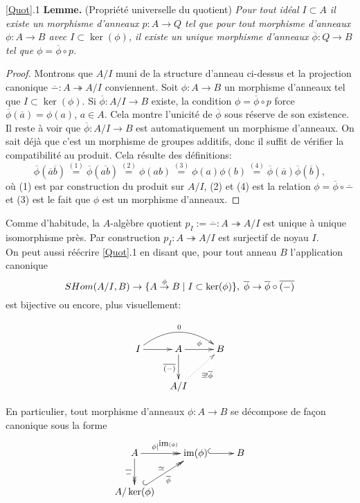 \documentclass[a4paper, oneside, 12pt]{book}
\theoremstyle{theoremeStyle} %
\theoremstyle{definition} %
\DeclareMathOperator{\SHom}{Hom}
\DeclareMathOperator{\im}{im}
\begin{document}
 \ref{Quot}.1 \textbf{Lemme.} (Propriété universelle du quotient) \textit{Pour tout idéal $I\subset A$ il existe un morphisme d'anneaux $p:A\rightarrow Q$ tel  que pour tout  morphisme d'anneaux $\phi:A\rightarrow B$ avec $I\subset \ker(\phi)$, il  existe un unique morphisme d'anneaux $\overline{\phi}:Q\rightarrow B$ tel que $\phi=  \overline{\phi}\circ p$.}

 \begin{proof} Montrons que  $A/I$ muni de la structure d'anneau ci-dessus et la projection canonique $\overline{-}:A\twoheadrightarrow A/I$ conviennent. Soit $\phi:A\rightarrow B$  un morphisme d'anneaux tel que $I\subset \ker(\phi)$. Si
 $\overline{\phi}:A/I\rightarrow B$ existe, la condition $\phi=  \overline{\phi}\circ p$ force $\overline{\phi}(\overline{a})=\phi(a)$, $a\in A$. Cela montre l'unicité de $\overline{\phi}$ sous réserve de son existence.   Il reste à voir que  $\overline{\phi}:A/I\rightarrow B$ est automatiquement un morphisme d'anneaux. On sait déjà que c'est un morphisme de groupes additifs, donc il suffit de vérifier la compatibilité au produit. Cela résulte des définitions: $$\overline{\phi}(\overline{a}\overline{b})\stackrel{(1)}{=}\overline{\phi}(\overline{a b})\stackrel{(2)}{=} \phi(ab)\stackrel{(3)}{=} \phi(a)\phi(b)\stackrel{(4)}{=}\overline{\phi}(\overline{a})\overline{\phi}(\overline{b}),$$
 où (1) est par construction du produit sur $A/I$, (2) et (4) est la relation  $\phi=  \overline{\phi}\circ \overline{-}$ et (3) est le fait que $\phi$ est un morphisme d'anneaux. \end{proof}

  Comme d'habitude, la $A$-algèbre quotient   $p_I:=\overline{-}:A\twoheadrightarrow A/I$ est unique à unique isomorphisme près.  Par construction $p_I: A\twoheadrightarrow A/I$ est surjectif de noyau $I$. \\

   On peut aussi réécrire \ref{Quot}.1 en disant que, pour tout anneau $B$ l'application  canonique
$$\\SHom(A/I,B)\rightarrow \lbrace A\stackrel{\phi}{\rightarrow}B\; |\; I\subset \ker(\phi)  \rbrace,\;\overline{\phi}\rightarrow \overline{\phi}\circ\overline{(-)}  $$
est bijective  ou encore, plus visuellement:

$$\xymatrix{I\ar[r]\ar@/^1.5pc/[rr]^{0}&A\ar[r]^{\phi}\ar[d]_{\overline{(-)}}&B\\
&A/I\ar@{.>}[ur]_{\exists ! \overline{\phi}}&}$$

   En particulier, tout  morphisme d'anneaux $\phi:A\rightarrow B$ se décompose de fa\c{c}on canonique sous la forme
  $$\xymatrix{A\ar@{->>}[r]^{\phi|^{\hbox{\rm \small im}(\phi)}}\ar@{->>}[d]_{\overline{-}}&\im(\phi)\ar@{^{(}->}[r]&B\\
  A/\ker(\phi)\ar@{^{(}->>}[ur]^\simeq_{\overline{\phi}}&&}$$
\end{document}
